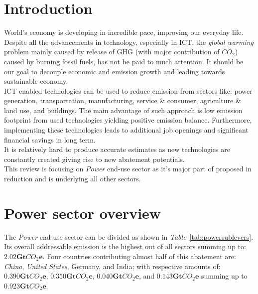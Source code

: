 \documentclass[11pt, twocolumn]{article}
\begin{document}
\section{Introduction}
World's economy is developing in incredible pace, improving our everyday life. Despite all the advancements in technology, especially in ICT, the \emph{global warming} problem mainly caused by release of GHG (with major contribution of $CO_2$) caused by burning fossil fuels, has not be paid to much attention. It should be our goal to decouple economic and emission growth and leading towards sustainable economy.\\
ICT enabled technologies can be used to reduce emission from sectors like: power generation, transportation, manufacturing, service \& consumer, agriculture \& land use, and buildings. The main advantage of such approach is low emission footprint from used technologies yielding positive emission balance. Furthermore, implementing these technologies leads to additional job openings and significant financial savings in long term.\\
It is relatively hard to produce accurate estimates as new technologies are constantly created giving rise to new abatement potentials.\\
This review is focusing on \emph{Power} end-use sector as it's major part of proposed in \citep{global2012smarter} reduction and is underlying all other sectors.

\section{Power sector overview}
The \emph{Power} end-use sector can be divided as shown in \emph{Table}~\ref{tab:powersublevers}. Its overall addressable emission is the highest out of all sectors summing up to: $\mathbf{2.02} \mathbf{Gt}CO_2\mathbf{e}$. Four countries contributing almost half of this abatement are: \emph{China}, \emph{United States}, Germany, and India; with respective amounts of: $\mathbf{0.390} \mathbf{Gt}CO_2\mathbf{e}$, $\mathbf{0.350} \mathbf{Gt}CO_2\mathbf{e}$, $\mathbf{0.040} \mathbf{Gt}CO_2\mathbf{e}$, and $\mathbf{0.143} \mathbf{Gt}CO_2\mathbf{e}$ summing up to $\mathbf{0.923} \mathbf{Gt}CO_2\mathbf{e}$.
\end{document}
